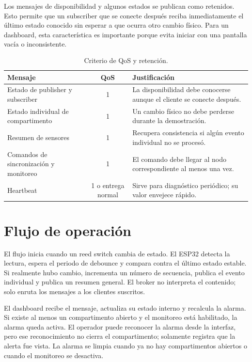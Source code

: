 \documentclass[12pt,letterpaper]{article}
\begin{document}
Los mensajes de disponibilidad y algunos estados se publican como retenidos. Esto permite que un subscriber que se conecte después reciba inmediatamente el último estado conocido sin esperar a que ocurra otro cambio físico. Para un dashboard, esta característica es importante porque evita iniciar con una pantalla vacía o inconsistente.

\begin{table}[H]
\centering
\caption{Criterio de QoS y retención.}
\begin{tabular}{p{}cp{}}
\toprule
\textbf{Mensaje} & \textbf{QoS} & \textbf{Justificación} \\
\midrule
Estado de publisher y subscriber & 1 & La disponibilidad debe conocerse aunque el cliente se conecte después. \\
Estado individual de compartimento & 1 & Un cambio físico no debe perderse durante la demostración. \\
Resumen de sensores & 1 & Recupera consistencia si algún evento individual no se procesó. \\
Comandos de sincronización y monitoreo & 1 & El comando debe llegar al nodo correspondiente al menos una vez. \\
Heartbeat & 1 o entrega normal & Sirve para diagnóstico periódico; su valor envejece rápido. \\
\bottomrule
\end{tabular}
\end{table}

\section{Flujo de operación}

El flujo inicia cuando un reed switch cambia de estado. El ESP32 detecta la lectura, espera el periodo de debounce y compara contra el último estado estable. Si realmente hubo cambio, incrementa un número de secuencia, publica el evento individual y publica un resumen general. El broker no interpreta el contenido; solo enruta los mensajes a los clientes suscritos.

El dashboard recibe el mensaje, actualiza su estado interno y recalcula la alarma. Si existe al menos un compartimento abierto y el monitoreo está habilitado, la alarma queda activa. El operador puede reconocer la alarma desde la interfaz, pero ese reconocimiento no cierra el compartimento; solamente registra que la alerta fue vista. La alarma se limpia cuando ya no hay compartimentos abiertos o cuando el monitoreo se desactiva.
\end{document}
